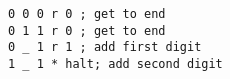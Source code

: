 \begin{verbatim}
0 0 0 r 0 ; get to end
0 1 1 r 0 ; get to end
0 _ 1 r 1 ; add first digit
1 _ 1 * halt; add second digit
\end{verbatim}